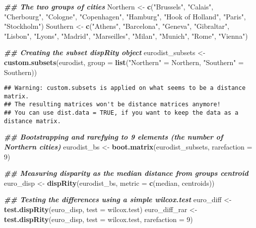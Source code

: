 \documentclass[
]{book}
\newenvironment{Shaded}{\begin{snugshade}}{\end{snugshade}}
\newcommand{\AttributeTok}[1]{\textcolor[rgb]{0.13,0.29,0.53}{#1}}
\newcommand{\DecValTok}[1]{\textcolor[rgb]{0.00,0.00,0.81}{#1}}
\newcommand{\DocumentationTok}[1]{\textcolor[rgb]{0.56,0.35,0.01}{\textbf{\textit{#1}}}}
\newcommand{\FunctionTok}[1]{\textcolor[rgb]{0.13,0.29,0.53}{\textbf{#1}}}
\newcommand{\NormalTok}[1]{#1}
\newcommand{\OtherTok}[1]{\textcolor[rgb]{0.56,0.35,0.01}{#1}}
\newcommand{\StringTok}[1]{\textcolor[rgb]{0.31,0.60,0.02}{#1}}
\begin{document}
\begin{Shaded}
\begin{Highlighting}[]
\DocumentationTok{\#\# The two groups of cities}
\NormalTok{Northern }\OtherTok{\textless{}{-}} \FunctionTok{c}\NormalTok{(}\StringTok{"Brussels"}\NormalTok{, }\StringTok{"Calais"}\NormalTok{, }\StringTok{"Cherbourg"}\NormalTok{, }\StringTok{"Cologne"}\NormalTok{, }\StringTok{"Copenhagen"}\NormalTok{,}
              \StringTok{"Hamburg"}\NormalTok{, }\StringTok{"Hook of Holland"}\NormalTok{, }\StringTok{"Paris"}\NormalTok{, }\StringTok{"Stockholm"}\NormalTok{)}
\NormalTok{Southern }\OtherTok{\textless{}{-}} \FunctionTok{c}\NormalTok{(}\StringTok{"Athens"}\NormalTok{, }\StringTok{"Barcelona"}\NormalTok{, }\StringTok{"Geneva"}\NormalTok{, }\StringTok{"Gibraltar"}\NormalTok{, }\StringTok{"Lisbon"}\NormalTok{, }\StringTok{"Lyons"}\NormalTok{,}
              \StringTok{"Madrid"}\NormalTok{, }\StringTok{"Marseilles"}\NormalTok{, }\StringTok{"Milan"}\NormalTok{, }\StringTok{"Munich"}\NormalTok{, }\StringTok{"Rome"}\NormalTok{, }\StringTok{"Vienna"}\NormalTok{)}

\DocumentationTok{\#\# Creating the subset dispRity object}
\NormalTok{eurodist\_subsets }\OtherTok{\textless{}{-}} \FunctionTok{custom.subsets}\NormalTok{(eurodist, }\AttributeTok{group =} \FunctionTok{list}\NormalTok{(}\StringTok{"Northern"} \OtherTok{=}\NormalTok{ Northern,}
                                                        \StringTok{"Southern"} \OtherTok{=}\NormalTok{ Southern))}
\end{Highlighting}
\end{Shaded}

\begin{verbatim}
## Warning: custom.subsets is applied on what seems to be a distance matrix.
## The resulting matrices won't be distance matrices anymore!
## You can use dist.data = TRUE, if you want to keep the data as a distance matrix.
\end{verbatim}

\begin{Shaded}
\begin{Highlighting}[]
\DocumentationTok{\#\# Bootstrapping and rarefying to 9 elements (the number of Northern cities)}
\NormalTok{eurodist\_bs }\OtherTok{\textless{}{-}} \FunctionTok{boot.matrix}\NormalTok{(eurodist\_subsets, }\AttributeTok{rarefaction =} \DecValTok{9}\NormalTok{)}

\DocumentationTok{\#\# Measuring disparity as the median distance from group\textquotesingle{}s centroid}
\NormalTok{euro\_disp }\OtherTok{\textless{}{-}} \FunctionTok{dispRity}\NormalTok{(eurodist\_bs, }\AttributeTok{metric =} \FunctionTok{c}\NormalTok{(median, centroids))}

\DocumentationTok{\#\# Testing the differences using a simple wilcox.test}
\NormalTok{euro\_diff }\OtherTok{\textless{}{-}} \FunctionTok{test.dispRity}\NormalTok{(euro\_disp, }\AttributeTok{test =}\NormalTok{ wilcox.test)}
\NormalTok{euro\_diff\_rar }\OtherTok{\textless{}{-}} \FunctionTok{test.dispRity}\NormalTok{(euro\_disp, }\AttributeTok{test =}\NormalTok{ wilcox.test, }\AttributeTok{rarefaction =} \DecValTok{9}\NormalTok{)}
\end{Highlighting}
\end{Shaded}
\end{document}
